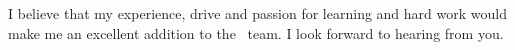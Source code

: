 \documentclass[11pt,a4paper,sans]{moderncv}        %
\begin{document}
I believe that my experience, drive and passion for learning and hard work would make me an excellent addition to the \company~team. 
I look forward to hearing from you.

\makeletterclosing

\end{document}
